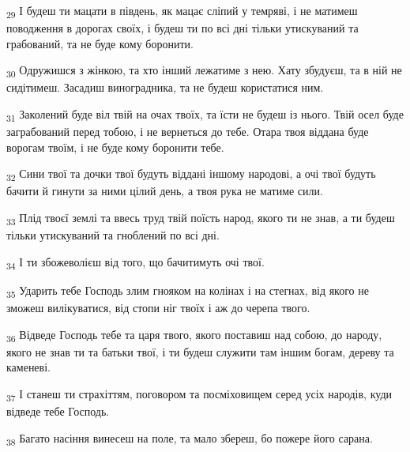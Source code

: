 \begin{tcolorbox}
\textsubscript{29} І будеш ти мацати в південь, як мацає сліпий у темряві, і не матимеш поводження в дорогах своїх, і будеш ти по всі дні тільки утискуваний та грабований, та не буде кому боронити.
\end{tcolorbox}
\begin{tcolorbox}
\textsubscript{30} Одружишся з жінкою, та хто інший лежатиме з нею. Хату збудуєш, та в ній не сидітимеш. Засадиш виноградника, та не будеш користатися ним.
\end{tcolorbox}
\begin{tcolorbox}
\textsubscript{31} Заколений буде віл твій на очах твоїх, та їсти не будеш із нього. Твій осел буде заграбований перед тобою, і не вернеться до тебе. Отара твоя віддана буде ворогам твоїм, і не буде кому боронити тебе.
\end{tcolorbox}
\begin{tcolorbox}
\textsubscript{32} Сини твої та дочки твої будуть віддані іншому народові, а очі твої будуть бачити й гинути за ними цілий день, а твоя рука не матиме сили.
\end{tcolorbox}
\begin{tcolorbox}
\textsubscript{33} Плід твоєї землі та ввесь труд твій поїсть народ, якого ти не знав, а ти будеш тільки утискуваний та гноблений по всі дні.
\end{tcolorbox}
\begin{tcolorbox}
\textsubscript{34} І ти збожеволієш від того, що бачитимуть очі твої.
\end{tcolorbox}
\begin{tcolorbox}
\textsubscript{35} Ударить тебе Господь злим гнояком на колінах і на стегнах, від якого не зможеш вилікуватися, від стопи ніг твоїх і аж до черепа твого.
\end{tcolorbox}
\begin{tcolorbox}
\textsubscript{36} Відведе Господь тебе та царя твого, якого поставиш над собою, до народу, якого не знав ти та батьки твої, і ти будеш служити там іншим богам, дереву та каменеві.
\end{tcolorbox}
\begin{tcolorbox}
\textsubscript{37} І станеш ти страхіттям, поговором та посміховищем серед усіх народів, куди відведе тебе Господь.
\end{tcolorbox}
\begin{tcolorbox}
\textsubscript{38} Багато насіння винесеш на поле, та мало збереш, бо пожере його сарана.
\end{tcolorbox}
